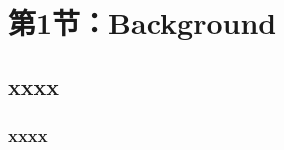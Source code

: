 \section{第1节：Background} %
\subsection{xxxx} %
\begin{frame}[fragile]
    \frametitle{xxxx}
\end{frame}
% 
% 
% 
% 
% 
% 
% 
% 
% 
% 
% 
% 
% 
% 
